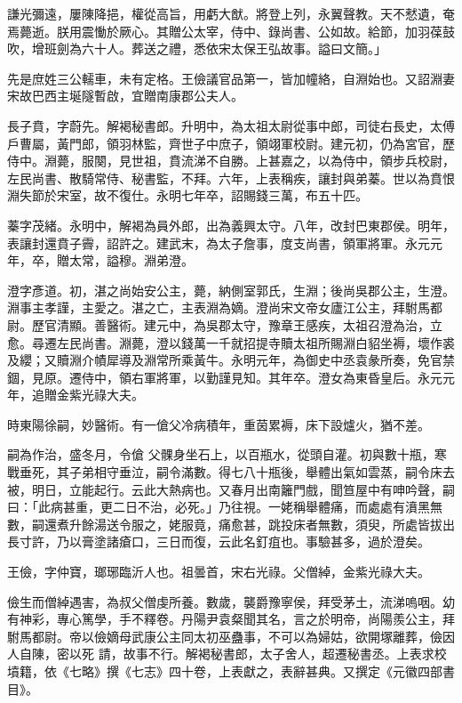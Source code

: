 \begin{pinyinscope}
 謙光彌遠，屢陳降挹，權從高旨，用虧大猷。將登上列，永翼聲教。天不憖遺，奄焉薨逝。朕用震慟於厥心。其贈公太宰，侍中、錄尚書、公如故。給節，加羽葆鼓吹，增班劍為六十人。葬送之禮，悉依宋太保王弘故事。謚曰文簡。」



 先是庶姓三公轜車，未有定格。王儉議官品第一，皆加幢絡，自淵始也。又詔淵妻宋故巴西主埏隧暫啟，宜贈南康郡公夫人。



 長子賁，字蔚先。解褐秘書郎。升明中，為太祖太尉從事中郎，司徒右長史，太傅戶曹屬，黃門郎，領羽林監，齊世子中庶子，領翊軍校尉。建元初，仍為宮官，歷侍中。淵薨，服闋，見世祖，賁流涕不自勝。上甚嘉之，以為侍中，領步兵校尉，左民尚書、散騎常侍、秘書監，不拜。六年，上表稱疾，讓封與弟蓁。世以為賁恨淵失節於宋室，故不復仕。永明七年卒，詔賜錢三萬，布五十匹。



 蓁字茂緒。永明中，解褐為員外郎，出為義興太守。八年，改封巴東郡侯。明年，表讓封還賁子霽，詔許之。建武末，為太子詹事，度支尚書，領軍將軍。永元元年，卒，贈太常，謚穆。淵弟澄。



 澄字彥道。初，湛之尚始安公主，薨，納側室郭氏，生淵；後尚吳郡公主，生澄。淵事主孝謹，主愛之。湛之亡，主表淵為嫡。澄尚宋文帝女廬江公主，拜駙馬都尉。歷官清顯。善醫術。建元中，為吳郡太守，豫章王感疾，太祖召澄為治，立愈。尋遷左民尚書。淵薨，澄以錢萬一千就招提寺贖太祖所賜淵白貂坐褥，壞作裘及纓；又贖淵介幘犀導及淵常所乘黃牛。永明元年，為御史中丞袁彖所奏，免官禁錮，見原。遷侍中，領右軍將軍，以勤謹見知。其年卒。澄女為東昏皇后。永元元年，追贈金紫光祿大夫。



 時東陽徐嗣，妙醫術。有一傖父冷病積年，重茵累褥，床下設爐火，猶不差。



 嗣為作治，盛冬月，令傖
 父髁身坐石上，以百瓶水，從頭自灌。初與數十瓶，寒戰垂死，其子弟相守垂泣，嗣令滿數。得七八十瓶後，舉體出氣如雲蒸，嗣令床去被，明日，立能起行。云此大熱病也。又春月出南籬門戲，聞笪屋中有呻吟聲，嗣曰：「此病甚重，更二日不治，必死。」乃往視。一姥稱舉體痛，而處處有濆黑無數，嗣還煮升餘湯送令服之，姥服竟，痛愈甚，跳投床者無數，須臾，所處皆拔出長寸許，乃以膏塗諸瘡口，三日而復，云此名釘疽也。事驗甚多，過於澄矣。



 王儉，字仲寶，瑯琊臨沂人也。祖曇首，宋右光祿。父僧綽，金紫光祿大夫。



 儉生而僧綽遇害，為叔父僧虔所養。數歲，襲爵豫寧侯，拜受茅土，流涕嗚咽。幼有神彩，專心篤學，手不釋卷。丹陽尹袁粲聞其名，言之於明帝，尚陽羨公主，拜駙馬都尉。帝以儉嫡母武康公主同太初巫蠱事，不可以為婦姑，欲開塚離葬，儉因人自陳，密以死
 請，故事不行。解褐秘書郎，太子舍人，超遷秘書丞。上表求校墳籍，依《七略》撰《七志》四十卷，上表獻之，表辭甚典。又撰定《元徽四部書目》。




\end{pinyinscope}
